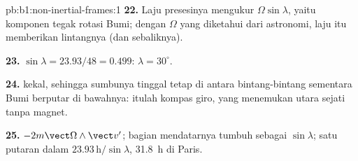 \begin{solution}{pb:b1:non-inertial-frames:1}
\textbf{22.} Laju presesinya mengukur $\Omega\sin\lambda$, yaitu komponen tegak
rotasi Bumi; dengan $\Omega$ yang diketahui dari astronomi, laju itu
memberikan lintangnya (dan sebaliknya).

\textbf{23.} $\sin\lambda = 23.93/48 = 0.499$: $\lambda = 30^\circ$.

\textbf{24.}  kekal, sehingga sumbunya tinggal tetap
di antara bintang-bintang sementara Bumi berputar di bawahnya: itulah kompas giro, yang
menemukan utara sejati tanpa magnet.

\textbf{25.}  $-2m\vect\Omega\wedge\vect v'$; bagian mendatarnya
tumbuh sebagai $\sin\lambda$; satu putaran dalam $23.93\,\text{h}/\sin\lambda$,
\qty{31.8}{h} di Paris.
\end{solution}
